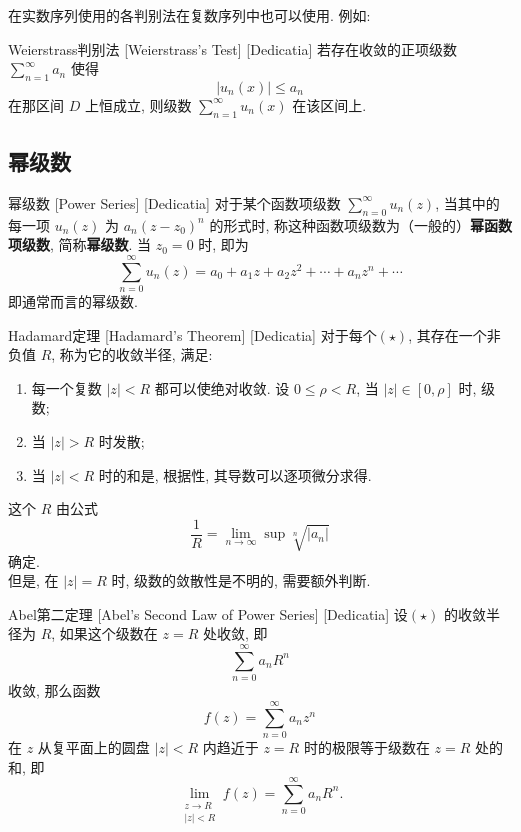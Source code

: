 \documentclass[UTF8]{ctexart}
\begin{document}
        在实数序列使用的各判别法在复数序列中也可以使用. 例如:

        \begin{thm}
            [UUID]
            {Weierstrass判别法}
            [Weierstrass's Test]
            [Dedicatia]
            若存在收敛的正项级数 \(\sum_{n = 1}^{\infty} a_n \) 使得\[|u_n(x)|\leqslant a_n\]
            在那区间 \(D\) 上恒成立, 则级数 \(\sum_{n = 1}^{\infty} u_n(x) \) 在该区间上. 
        \end{thm}
    
    \subsection{幂级数}

        \begin{dfn}
            [PowerSeries]
            {幂级数}
            [Power Series]
            [Dedicatia]
            对于某个函数项级数 \(\sum_{n = 0}^{\infty} u_n(z) \), 当其中的每一项 \(u_n(z)\) 为 \(a_n(z-z_0)^n\) 的形式时, 称这种函数项级数为（一般的）\textbf{幂函数项级数}, 简称\textbf{幂级数}. 当 \(z_0=0\) 时, 即为
            \[\sum_{n = 0}^{\infty} u_n(z)=a_0+a_1z+a_2z^2+\cdots+a_nz^n+\cdots \tag{ \(\star\) }\]
            即通常而言的幂级数. 
        \end{dfn}

        \begin{thm}
            [UUID]
            {Hadamard定理}
            [Hadamard's Theorem]
            [Dedicatia]
            对于每个\PowerSeries  \((\star)\), 其存在一个非负值 \(R\), 称为它的收敛半径, 满足: 
            \begin{enumerate}
                \item 每一个复数 \(|z|<R\) 都可以使\PowerSeries 绝对收敛. 设 \(0\leqslant\rho <R\), 当 \(|z|\in[0,\rho]\) 时, 级数; 
                \item 当 \(|z|>R\) 时\PowerSeries 发散; 
                \item 当 \(|z|<R\) 时的和是, 根据 性, 其导数可以逐项微分求得. 
            \end{enumerate}
            这个 \(R\) 由公式
            \[\frac{1}{R}=\lim_{n\to \infty}\sup\sqrt[n]{|a_n|}\]
            确定. \\
            但是, 在 \(|z|=R\) 时, 级数的敛散性是不明的, 需要额外判断. 
        \end{thm}

        \begin{thm}
            [UUID]
            {Abel第二定理}
            [Abel's Second Law of Power Series]
            [Dedicatia]
            设\PowerSeries  \((\star)\) 的收敛半径为 \(R\), 如果这个级数在 \(z = R\) 处收敛, 即
            \[\sum_{n=0}^{\infty} a_n R^n\]
            收敛, 那么函数
            \[f(z) = \sum_{n=0}^{\infty} a_n z^n\]
            在 \(z\) 从复平面上的圆盘 \(|z| < R\) 内趋近于 \(z = R\) 时的极限等于级数在 \(z = R\) 处的和, 即
            \[\lim_{\substack{z \to R \\ |z| < R}} f(z) = \sum_{n=0}^{\infty} a_n R^n.\]
        \end{thm}
\end{document}
